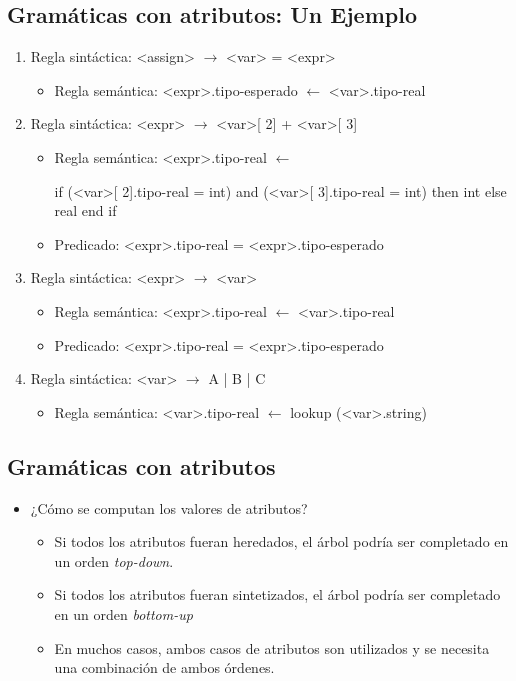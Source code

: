 \documentclass[11pt]{article}
\begin{document}
\subsection*{Gramáticas con atributos: Un Ejemplo}
\label{sec:orgc838a29}
\begin{enumerate}
\item Regla sintáctica: <assign> \(\to\) <var> = <expr>
\begin{itemize}
\item Regla semántica: <expr>.tipo-esperado \(\leftarrow\) <var>.tipo-real
\end{itemize}
\item Regla sintáctica: <expr> \(\to\) <var>[ 2] + <var>[ 3]
\begin{itemize}
\item Regla semántica: <expr>.tipo-real  \(\leftarrow\)

if (<var>[ 2].tipo-real = int) and (<var>[ 3].tipo-real = int)
then int else real end if

\item Predicado: <expr>.tipo-real = <expr>.tipo-esperado
\end{itemize}

\item Regla sintáctica: <expr> \(\to\) <var>
\begin{itemize}
\item Regla semántica: <expr>.tipo-real \(\leftarrow\) <var>.tipo-real
\item Predicado: <expr>.tipo-real = <expr>.tipo-esperado
\end{itemize}

\item Regla sintáctica: <var> \(\to\) A | B | C
\begin{itemize}
\item Regla semántica:  <var>.tipo-real \(\leftarrow\) lookup (<var>.string)
\end{itemize}
\end{enumerate}

\subsection*{Gramáticas con atributos}
\label{sec:org9f2ae14}
\begin{itemize}
\item ¿Cómo se computan los valores de atributos?
\begin{itemize}
\item Si todos los atributos fueran heredados, el árbol podría ser
completado en un orden \emph{top-down}.
\item Si todos los atributos fueran sintetizados, el árbol podría ser
completado en un orden \emph{bottom-up}
\item En muchos casos, ambos casos de atributos son utilizados y se
necesita una combinación de ambos órdenes.
\end{itemize}
\end{itemize}
\end{document}
